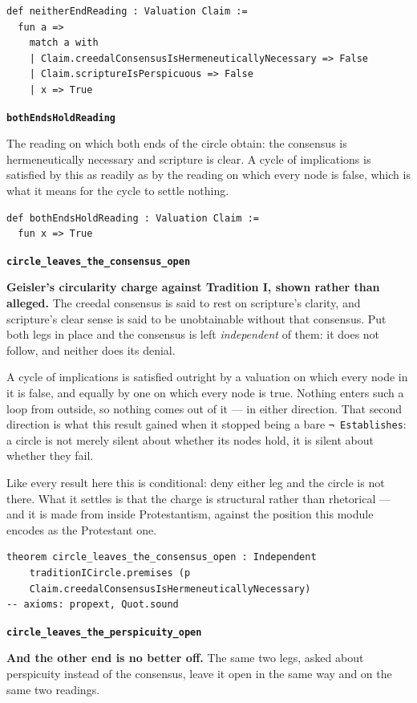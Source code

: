 \documentclass[11pt]{article}
\begin{document}
{\small\begin{verbatim}
def neitherEndReading : Valuation Claim :=
  fun a =>
    match a with
    | Claim.creedalConsensusIsHermeneuticallyNecessary => False
    | Claim.scriptureIsPerspicuous => False
    | x => True
\end{verbatim}}
\par\medskip\noindent\textbf{\texttt{both\allowbreak{}Ends\allowbreak{}Hold\allowbreak{}Reading}}\par\nobreak\noindent
The reading on which both ends of the circle obtain: the consensus is hermeneutically necessary and scripture is clear. A cycle of implications is satisfied by this as readily as by the reading on which every node is false, which is what it means for the cycle to settle nothing.

{\small\begin{verbatim}
def bothEndsHoldReading : Valuation Claim :=
  fun x => True
\end{verbatim}}
\par\medskip\noindent\textbf{\texttt{circle\_\allowbreak{}leaves\_\allowbreak{}the\_\allowbreak{}consensus\_\allowbreak{}open}}\par\nobreak\noindent
\textbf{Geisler’s circularity charge against Tradition I, shown rather than alleged.} The creedal consensus is said to rest on scripture’s clarity, and scripture’s clear sense is said to be unobtainable without that consensus. Put both legs in place and the consensus is left \emph{independent} of them: it does not follow, and neither does its denial.

A cycle of implications is satisfied outright by a valuation on which every node in it is false, and equally by one on which every node is true. Nothing enters such a loop from outside, so nothing comes out of it — in either direction. That second direction is what this result gained when it stopped being a bare \texttt{¬ Establishes}: a circle is not merely silent about whether its nodes hold, it is silent about whether they fail.

Like every result here this is conditional: deny either leg and the circle is not there. What it settles is that the charge is structural rather than rhetorical — and it is made from inside Protestantism, against the position this module encodes as the Protestant one.

{\small\begin{verbatim}
theorem circle_leaves_the_consensus_open : Independent
    traditionICircle.premises (p
    Claim.creedalConsensusIsHermeneuticallyNecessary)
-- axioms: propext, Quot.sound
\end{verbatim}}
\par\medskip\noindent\textbf{\texttt{circle\_\allowbreak{}leaves\_\allowbreak{}the\_\allowbreak{}perspicuity\_\allowbreak{}open}}\par\nobreak\noindent
\textbf{And the other end is no better off.} The same two legs, asked about perspicuity instead of the consensus, leave it open in the same way and on the same two readings.
\end{document}
